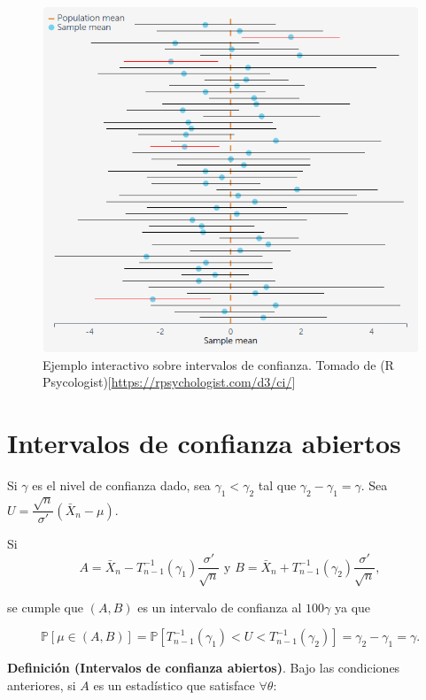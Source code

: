 \documentclass[
  12pt,
]{book}
\begin{document}
\begin{figure}
\centering
\includegraphics{./images/interpreting_confidence_intervals.png}
\caption{Ejemplo interactivo sobre intervalos de confianza. Tomado de (R Psycologist){[}\url{https://rpsychologist.com/d3/ci/}{]}}
\end{figure}

\hypertarget{intervalos-de-confianza-abiertos}{%
\section{Intervalos de confianza abiertos}\label{intervalos-de-confianza-abiertos}}

Si \(\gamma\) es el nivel de confianza dado, sea \(\gamma_1<\gamma_2\) tal que \(\gamma_2 -\gamma_1 = \gamma\). Sea \(U = \dfrac{\sqrt n}{\sigma'}(\bar X_n-\mu)\).

Si
\[
A= \bar X_n - T_{n-1}^{-1}(\gamma_1)\dfrac{\sigma'}{\sqrt n} \text{ y } B= \bar X_n +
T_{n-1}^{-1}(\gamma_2)\dfrac{\sigma'}{\sqrt n},
\]

se cumple que \((A,B)\) es un intervalo de confianza al \(100\gamma\) ya que

\[
\mathbb P[\mu \in (A,B)] = \mathbb P[T_{n-1}^{-1}(\gamma_1)<U<T_{n-1}^{-1}(\gamma_2)] =
\gamma_2-\gamma_1 = \gamma.
\]

\textbf{Definición (Intervalos de confianza abiertos)}. Bajo las condiciones
anteriores, si \(A\) es un estadístico que satisface \(\forall \theta\):
\end{document}
